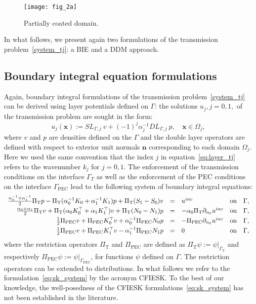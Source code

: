 \documentclass[11pt]{article}
\numberwithin{equation}{section}
\newcommand{\PEC}{\mathrm{PEC}}
\newcommand{\TR}{\mathrm{T}}
\begin{document}
\begin{figure}
\centering
\texttt{[image: fig\_2a]}
\caption{Partially coated domain.}
\label{fig:coated}
\end{figure}

In what follows, we present again two formulations of the transmission problem~\eqref{system_tj}: a BIE  and a DDM approach.


\subsection{Boundary integral equation formulations\label{MS2}}

Again, boundary integral formulations of the transmission problem~\eqref{system_tj} can be derived using layer potentials defined on $\Gamma$: the solutions $u_j,j=0,1,$ of the transmission problem are sought in the form:
\begin{equation}\label{eq:layer_tj}
  u_j(\mathbf{x}):=SL_{\Gamma,j}\ v+(-1)^j\alpha_j^{-1} DL_{\Gamma,j}\ p,\quad \mathbf{x}\in\Omega_j,
\end{equation}
where $v$ and $p$ are densities defined on the $\Gamma$ and the double layer operators are defined with respect to exterior unit normals $\mathbf{n}$ corresponding to each domain $\Omega_j$. Here we used the same convention that the index $j$ in equation~\eqref{eq:layer_tj} refers to the wavenumber $k_j$ for $j=0,1$. The enforcement of the transmission conditions on the interface $\Gamma_T$ as well as the enforcement of the PEC conditions on the interface $\Gamma_{\PEC}$ lead to the following system of boundary integral equations:
\begin{equation}\label{eq:sk_system}
  \begin{array}{rclll}
  \frac{\alpha_0^{-1}+\alpha_1^{-1}}{2}\Pi_\TR p-\Pi_\TR(\alpha_0^{-1}K_{0}+\alpha_1^{-1}K_{1})p+\Pi_\TR(S_{1}-S_{0})v&=&u^{inc}&{\rm on}& \Gamma,\smallskip\\
  \frac{\alpha_0+\alpha_1}{2}\Pi_\TR v+\Pi_\TR(\alpha_0K_{0}^\top+\alpha_1K_{1}^\top)v+\Pi_\TR(N_{0}-N_{1})p&=&-\alpha_0\Pi_\TR\partial_{n_0}u^{inc}&{\rm on}&\Gamma,\smallskip\\
  \frac{1}{2}\Pi_{\PEC}v+\Pi_{\PEC}K_{0}^\top v+\alpha_0^{-1}\Pi_{\PEC}N_{0}p&=&-\Pi_{\PEC}\partial_{n_0}u^{inc}&{\rm on}& \Gamma,\smallskip\\
  \frac{1}{2}\Pi_{\PEC}v+\Pi_{\PEC}K_{1}^\top v-\alpha_1^{-1}\Pi_{\PEC}N_{1}p&=&0&{\rm on}& \Gamma,
  \end{array}
\end{equation}
where the restriction operators $\Pi_\TR$ and $\Pi_{\PEC}$ are defined as $\Pi_\TR\psi:=\psi|_{\Gamma_\TR}$ and respectively $\Pi_{\PEC}\psi:=\psi|_{\Gamma_{\PEC}}$, for functions $\psi$ defined on $\Gamma$. The restriction operators can be extended to distributions. In what follows we refer to the formulation~\eqref{eq:sk_system} by the acronym CFIESK. To the best of our knowledge, the well-posedness of the CFIESK formulations~\eqref{eq:sk_system} has not been established in the literature.
\end{document}
